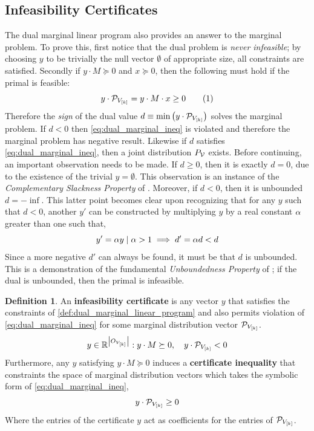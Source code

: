 \documentclass[aps, 10pt, english, twoside, pra, nofootinbib, longbibliography]{revtex4-1}
\theoremstyle{plain}
\theoremstyle{definition}
\newtheorem{definition}[theorem]{Definition}
\theoremstyle{remark}
\newcommand{\term}[1]{\textcolor{Mahogany}{\textbf{#1}}}
\begin{document}
    \subsection{Infeasibility Certificates}
    \label{sec:infeasibility_certificates}
    The dual marginal linear program also provides an answer to the marginal problem. To prove this, first notice that the dual problem is \textit{never infeasible}; by choosing $y$ to be trivially the null vector $\emptyset$ of appropriate size, all constraints are satisfied. Secondly if $y \cdot M \succeq 0$ and $x \succeq 0$, then the following must hold if the primal is feasible:
    \[ y \cdot \probvec[V_{\bs{k}}] =  y \cdot M \cdot x \geq 0 \eq \label{eq:dual_marginal_ineq} \]
    Therefore the \textit{sign} of the dual value $d \defined \min \br{y \cdot \probvec[V_{\bs{k}}]}$ solves the marginal problem. If $d < 0$ then \cref{eq:dual_marginal_ineq} is violated and therefore the marginal problem has negative result. Likewise if $d$ satisfies \cref{eq:dual_marginal_ineq}, then a joint distribution $\prob[\mathcal{V}]$ exists. Before continuing, an important observation needs to be made. If $d \geq 0$, then it is exactly $d = 0$, due to the existence of the trivial $y = \emptyset$. This observation is an instance of the \textit{Complementary Slackness Property} of \cite{Bradley_1977}.  Moreover, if $d < 0$, then it is unbounded $d = -\inf$. This latter point becomes clear upon recognizing that for any $y$ such that $d < 0$, another $y'$ can be constructed by multiplying $y$ by a real constant $\alpha$ greater than one such that,
    \[ y' = \alpha y \mid \alpha > 1 \implies d' = \alpha d < d \]
    Since a more negative $d'$ can always be found, it must be that $d$ is unbounded. This is a demonstration of the fundamental \textit{Unboundedness Property} of \cite{Bradley_1977}; if the dual is unbounded, then the primal is infeasible.


    \begin{definition} An \term{infeasibility certificate} is any vector $y$ that satisfies the constraints of \cref{def:dual_marginal_linear_program} and also permits violation of \cref{eq:dual_marginal_ineq} for some marginal distribution vector $\probvec[V_{\bs{k}}]$.
    \[ y \in \R^{\abs{O_{V_{\bs{k}}}}} : y \cdot M \succeq 0, \quad y \cdot \probvec[V_{\bs{k}}] < 0 \]
    Furthermore, any $y$ satisfying $y \cdot M \succeq 0$ induces a \term{certificate inequality} that constraints the space of marginal distribution vectors which takes the symbolic form of \cref{eq:dual_marginal_ineq},
    \[ y \cdot \probvec[V_{\bs{k}}] \geq 0 \]
    Where the entries of the certificate $y$ act as coefficients for the entries of $\probvec[V_{\bs{k}}]$.
    \end{definition}
\end{document}
